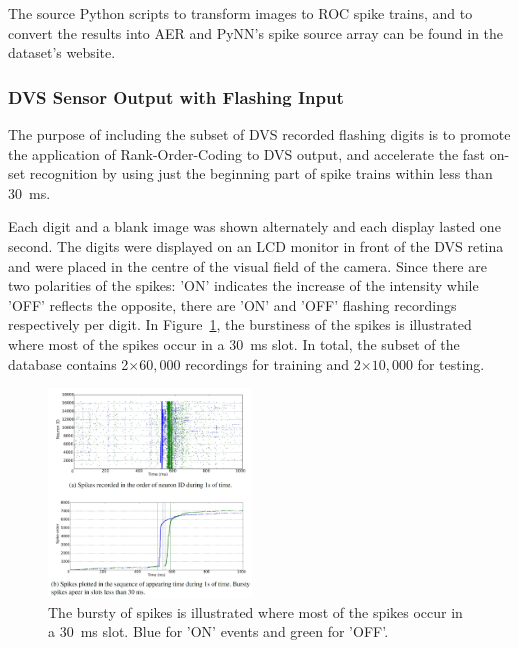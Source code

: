 \documentclass{frontiersENG} %
\begin{document}
The source Python scripts to transform images to ROC spike trains, and to convert the results into AER and PyNN's spike source array can be found in the dataset's website.
\subsubsection{DVS Sensor Output with Flashing Input}
\label{subsec_flash}
The purpose of including the subset of DVS recorded flashing digits is to promote the application of Rank-Order-Coding to DVS output, and accelerate the fast on-set recognition by using just the beginning part of spike trains within less than 30~ms.

Each digit and a blank image was shown alternately and each display lasted one second.
The digits were displayed on an LCD monitor in front of the DVS retina~\citep{serrano2013128} and were placed in the centre of the visual field of the camera.
Since there are two polarities of the spikes: 'ON' indicates the increase of the intensity while 'OFF' reflects the opposite, there are 'ON' and 'OFF' flashing recordings respectively per digit.
In Figure~\ref{fig:flash}, the burstiness of the spikes is illustrated where most of the spikes occur in a 30~ms slot. 
In total, the subset of the database contains 2$\times$$60,000$ recordings for training and 2$\times$$10,000$ for testing.

\begin{figure}[b!]
	\centering
	\includegraphics[width=0.48\textwidth]{fig5}	
	\caption{The bursty of spikes is illustrated where most of the spikes occur in a 30~ms slot. Blue for 'ON' events and green for 'OFF'.}
	\label{fig:flash}
\end{figure}
\end{document}
